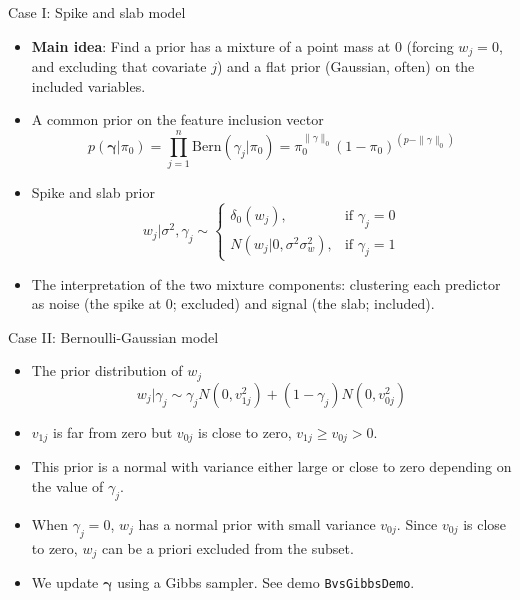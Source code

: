 \documentclass[10pt,mathserif]{beamer}
\begin{document}
\begin{frame}{Case I: Spike and slab model}
    \begin{itemize}
        \item \textbf{Main idea}: Find a prior has a mixture of a point mass at $0$ (forcing $w_j = 0$, and excluding that covariate $j$) and a flat prior (Gaussian, often) on the included variables.
        \item A common prior on the feature inclusion vector
        \begin{equation*}
            p(\bm{\gamma}|\pi_0) 
              =   \prod_{j=1}^n\text{Bern}(\gamma_j|\pi_0) 
              =   \pi_0^{\|\gamma\|_0} (1-\pi_0)^{(p - \|\gamma\|_0)}
        \end{equation*}
        \item Spike and slab prior
        \begin{equation*}
          w_j|\sigma^2,\gamma_j \sim
          \begin{cases}
            \delta_0(w_j), & \text{if $\gamma_j = 0$}\\
            N(w_j|0,\sigma^2\sigma_w^2), & \text{if $\gamma_j = 1$}
          \end{cases}
        \end{equation*}
        \item The interpretation of the two mixture components: clustering each predictor as noise (the spike at 0; excluded) and signal (the slab; included).
    \end{itemize}
\end{frame}

\begin{frame}{Case II: Bernoulli-Gaussian model}
    \begin{itemize}
        \item The prior distribution of $w_j$
        \begin{equation*}
          w_j|\gamma_j \sim \gamma_j N(0,v_{1j}^2) + (1-\gamma_j) N(0,v_{0j}^2) 
        \end{equation*}
        \item $v_{1j}$ is far from zero but $v_{0j}$ is close to zero, $v_{1j} \geq v_{0j} > 0$.
        \item This prior is a normal with variance either large or close to zero depending on the value of $\gamma_j$. 
        \item When $\gamma_j = 0$, $w_j$ has a normal prior with small variance $v_{0j}$. Since $v_{0j}$ is close to zero, $w_j$ can be a priori excluded from the subset.
        \item We update $\bm{\gamma}$ using a Gibbs sampler. See demo \texttt{BvsGibbsDemo}.
    \end{itemize}
\end{frame}
\end{document}
